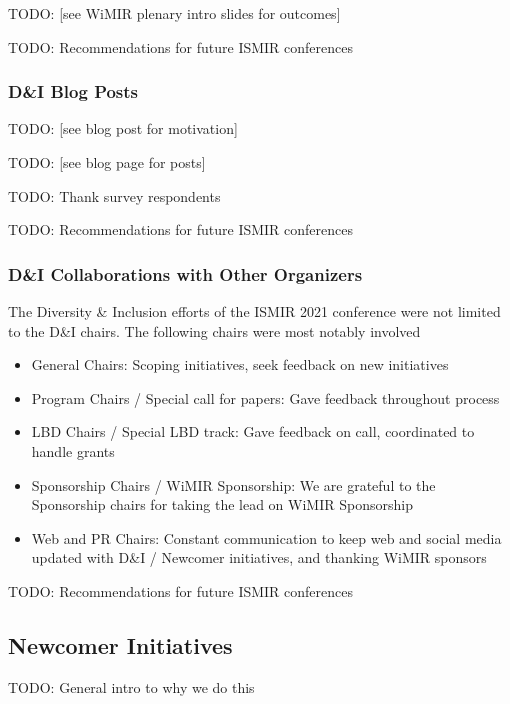 \documentclass[%
10pt,								%
]
{scrartcl}
\begin{document}
            TODO: [see WiMIR plenary intro slides for outcomes]

            TODO: Recommendations for future ISMIR conferences
            
        \subsubsection{D\&I Blog Posts}
            TODO: [see blog post for motivation]

            TODO: [see blog page for posts]

            TODO: Thank survey respondents

            TODO: Recommendations for future ISMIR conferences
            
        \subsubsection{D\&I Collaborations with Other Organizers}
            The Diversity \& Inclusion efforts of the ISMIR 2021 conference were not limited to the D\&I chairs. The following chairs were most notably involved
                \begin{itemize}
                    \item   General Chairs: Scoping initiatives, seek feedback on new initiatives
                    \item   Program Chairs / Special call for papers: Gave feedback throughout process
                    \item   LBD Chairs / Special LBD track: Gave feedback on call, coordinated to handle grants
                    \item   Sponsorship Chairs / WiMIR Sponsorship: We are grateful to the Sponsorship chairs for taking the lead on WiMIR Sponsorship
                    \item   Web and PR Chairs: Constant communication to keep web and social media updated with D\&I / Newcomer initiatives, and thanking WiMIR sponsors
                \end{itemize}

            TODO: Recommendations for future ISMIR conferences
            
    \subsection{Newcomer Initiatives}
        TODO: General intro to why we do this
\end{document}
